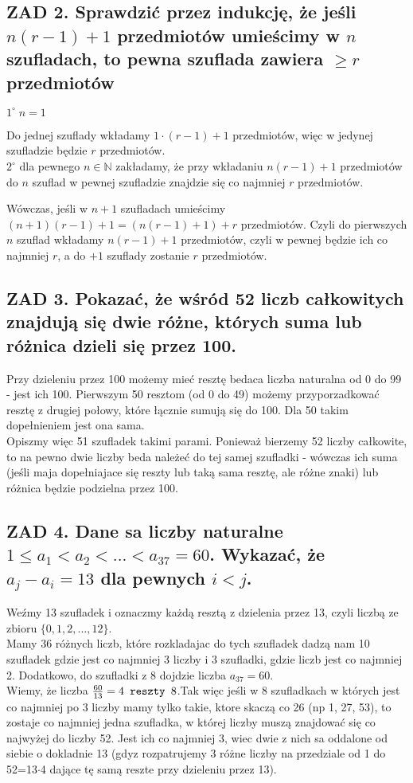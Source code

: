 \documentclass{article}
\newcommand{\N}{\mathbb{N}}
\begin{document}
\subsection*{ZAD 2. Sprawdzić przez indukcję, że jeśli $n(r-1)+1$ przedmiotów umieścimy w $n$ szufladach, to pewna szuflada zawiera $\geq r$ przedmiotów}
$1^{\circ}\;n = 1$\smallskip\par
Do jednej szuflady wkładamy $1\cdot(r-1)+1$ przedmiotów, więc w jedynej szufladzie będzie $r$ przedmiotów.\medskip\\
$2^{\circ}$ dla pewnego $n\in\N$ zakładamy, że przy wkładaniu $n(r-1)+1$ przedmiotów do $n$ szuflad w pewnej szufladzie znajdzie się co najmniej $r$ przedmiotów.\smallskip\par
Wówczas, jeśli w $n+1$ szufladach umieścimy $(n+1)(r-1)+1=(n(r-1)+1)+r$ przedmiotów. Czyli do pierwszych $n$ szuflad wkładamy $n(r-1)+1$ przedmiotów, czyli w pewnej będzie ich co najmniej $r$, a do $+1$ szuflady zostanie $r$ przedmiotów.
\newpage
\subsection*{ZAD 3. Pokazać, że wśród 52 liczb całkowitych znajdują się dwie różne, których suma lub różnica dzieli się przez 100.}
  Przy dzieleniu przez 100 możemy mieć resztę bedaca liczba naturalna od 0 do 99 - jest ich 100. Pierwszym 50 resztom (od 0 do 49) możemy przyporzadkować resztę z drugiej połowy, które łącznie sumują się do 100. Dla 50 takim dopełnieniem jest ona sama. \\
  Opiszmy więc 51 szufladek takimi parami. Ponieważ bierzemy 52 liczby całkowite, to na pewno dwie liczby beda należeć do tej samej szufladki - wówczas ich suma (jeśli maja dopełniajace się reszty lub taką sama resztę, ale różne znaki) lub różnica będzie podzielna przez 100.
\newpage
\subsection*{ZAD 4. Dane sa liczby naturalne $1\leq a_1<a_2<...<a_{37}=60$. Wykazać, że $a_j-a_i=13$ dla pewnych $i<j$.}
  Weźmy 13 szufladek i oznaczmy każdą resztą z dzielenia przez 13, czyli liczbą ze zbioru $\{0, 1, 2,..., 12\}$. \\
  Mamy 36 różnych liczb, które rozkladajac do tych szufladek dadzą nam 10 szufladek gdzie jest co najmniej 3 liczby i 3 szufladki, gdzie liczb jest co najmniej 2. Dodatkowo, do szufladki z 8 dojdzie liczba $a_{37}=60$.\\
  Wiemy, że liczba ${60\over13}=4\texttt{ reszty }8$.Tak więc jeśli w 8 szufladkach w których jest co najmniej po 3 liczby mamy tylko takie, ktore skaczą co 26 (np 1, 27, 53), to zostaje co najmniej jedna szufladka, w której liczby muszą znajdować się co najwyżej do liczby 52. Jest ich co najmniej 3, wiec dwie z nich sa oddalone od siebie o dokladnie 13 (gdyz rozpatrujemy 3 różne liczby na przedziale od 1 do 52=13$\cdot$4 dające tę samą reszte przy dzieleniu przez 13).
\newpage
\end{document}

